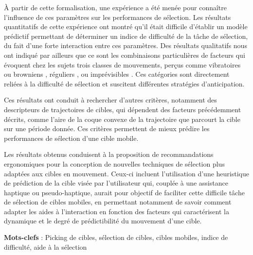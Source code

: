À partir de cette formalisation, une expérience a été menée pour connaître l'influence de ces paramètres sur les performances de sélection. Les résultats quantitatifs de cette expérience ont montré qu'il était difficile d'établir un modèle prédictif permettant de déterminer un indice de difficulté de la tâche de sélection, du fait d'une forte interaction entre ces paramètres. Des résultats qualitatifs nous ont indiqué par ailleurs que ce sont les combinaisons particulières de facteurs qui évoquent chez les sujets trois classes de mouvements, perçus comme \og vibratoires \fg{} ou \og browniens \fg{}, \og réguliers \fg{}, ou \og imprévisibles \fg{}. Ces catégories sont directement reliées à la difficulté de sélection et suscitent différentes stratégies d'anticipation.

Ces résultats ont conduit à rechercher d'autres critères, notamment des descripteurs de trajectoires de cibles, qui dépendent des facteurs précédemment décrits, comme l'aire de la coque convexe de la trajectoire que parcourt la cible sur une période donnée. Ces critères permettent de mieux prédire les performances de sélection d'une cible mobile.

Les résultats obtenus conduisent à la proposition de recommandations ergonomiques pour la conception de nouvelles techniques de sélection plus adaptées aux cibles en mouvement. Ceux-ci incluent l'utilisation d'une heuristique de prédiction de la cible visée par l’utilisateur qui, couplée à une assistance haptique ou pseudo-haptique, aurait pour objectif de faciliter cette difficile tâche de sélection de cibles mobiles, en permettant notamment de savoir comment adapter les aides à l'interaction en fonction des facteurs qui caractérisent la dynamique et le degré de prédictibilité du mouvement d'une cible.
 


\textbf{Mots-clefs} : Picking de cibles, sélection de cibles, cibles mobiles, indice de difficulté, aide à la sélection
